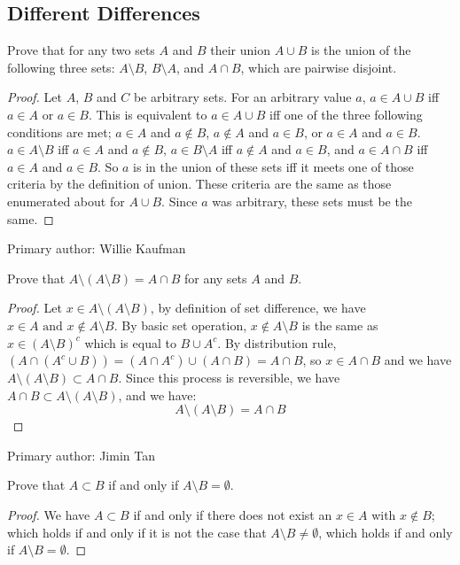 \subsection{Different Differences}%
			\begin{minorEx}%
            Prove that for any two sets $A$ and $B$ their union $A \cup B$ is the union of the following three sets: $A \setminus B$, $B \setminus A$, and $A \cap B$, which are pairwise disjoint.
            \begin{proof}Let $A$, $B$ and $C$ be arbitrary sets. For an arbitrary value $a$, $a \in A \cup B$ iff $a \in A$ or $a \in B$. This is equivalent to $a \in A \cup B$ iff one of the three following conditions are met; $a \in A$ and $a \not \in B$, $a \not \in A$ and $a \in B$, or $a \in A$ and $a \in B$. \newline $a \in A \setminus B$ iff $a \in A$ and $a \not \in B$, $a \in B \setminus A$ iff $a \not \in A$ and $a \in B$, and $a \in A \cap B$ iff $a \in A$ and $a \in B$. So $a$ is in the union of these sets iff it meets one of those criteria by the definition of union. These criteria are the same as those enumerated about for $A \cup B$. Since $a$ was arbitrary, these sets must be the same.
            
            \end{proof}
            \end{minorEx}
 Primary author: Willie Kaufman
            \begin{minorEx} %
            Prove that $A \setminus (A \setminus B) = A \cap B$ for any sets $A$ and $B$.
            \begin{proof}
            Let $x \in A \setminus (A \setminus B)$, by definition of set difference, we have $x \in A \text{ and } x \not\in A \setminus B$. By basic set operation, $x \not\in A \setminus B$ is the same as $x \in  (A \setminus B)^c$ which is equal to $B \cup A^c$. By distribution rule, $(A \cap (A^c \cup B)) = (A \cap A^c) \cup (A \cap B) = A \cap B$, so $x \in A \cap B$ and we have $A \setminus (A \setminus B) \subset A \cap B$. Since this process is reversible, we have $A \cap B  \subset A \setminus (A \setminus B)$, and we have: $$A \setminus (A \setminus B) = A \cap B$$
            \end{proof}
                    Primary author: Jimin Tan
            \end{minorEx}

            \begin{minorEx} %
            Prove that $A \subset B$ if and only if $A \setminus B = \emptyset$.
            \end{minorEx}
            \begin{proof}
            We have $A \subset B$ if and only if there does not exist an $x \in A$ with $x \notin B$; which holds if and only if it is not the case that $A \setminus B \ne \emptyset$, which holds if and only if $A \setminus B = \emptyset$.
			\end{proof}
            
